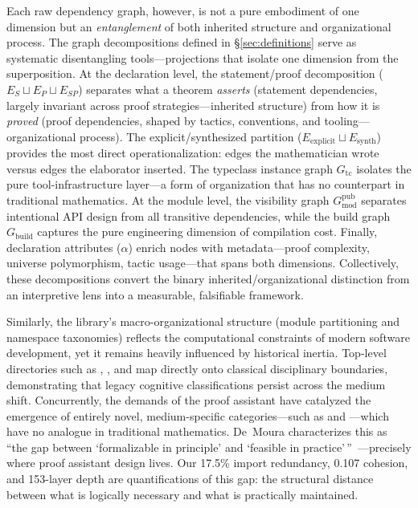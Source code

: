Each raw dependency graph, however, is not a pure embodiment of one dimension but an \emph{entanglement} of both inherited structure and organizational process. The graph decompositions defined in \S\ref{sec:definitions} serve as systematic disentangling tools---projections that isolate one dimension from the superposition. At the declaration level, the statement/proof decomposition ($E_S \sqcup E_P \sqcup E_{SP}$) separates what a theorem \emph{asserts} (statement dependencies, largely invariant across proof strategies---inherited structure) from how it is \emph{proved} (proof dependencies, shaped by tactics, conventions, and tooling---organizational process). The explicit/synthesized partition ($E_{\mathrm{explicit}} \sqcup E_{\mathrm{synth}}$) provides the most direct operationalization: edges the mathematician wrote versus edges the elaborator inserted. The typeclass instance graph $G_{\mathrm{tc}}$ isolates the pure tool-infrastructure layer---a form of organization that has no counterpart in traditional mathematics. At the module level, the visibility graph $G_{\mathrm{mod}}^{\mathrm{pub}}$ separates intentional API design from all transitive dependencies, while the build graph $G_{\mathrm{build}}$ captures the pure engineering dimension of compilation cost. Finally, declaration attributes ($\alpha$) enrich nodes with metadata---proof complexity, universe polymorphism, tactic usage---that spans both dimensions. Collectively, these decompositions convert the binary inherited/organizational distinction from an interpretive lens into a measurable, falsifiable framework.

Similarly, the library's macro-organizational structure (module partitioning and namespace taxonomies) reflects the computational constraints of modern software development, yet it remains heavily influenced by historical inertia. Top-level directories such as , , and  map directly onto classical disciplinary boundaries, demonstrating that legacy cognitive classifications persist across the medium shift. Concurrently, the demands of the proof assistant have catalyzed the emergence of entirely novel, medium-specific categories---such as  and ---which have no analogue in traditional mathematics. De~Moura characterizes this as ``the gap between `formalizable in principle' and `feasible in practice'\,''~\cite{demoura2026proofassistants}---precisely where proof assistant design lives. Our 17.5\% import redundancy, 0.107 cohesion, and 153-layer depth are quantifications of this gap: the structural distance between what is logically necessary and what is practically maintained.

